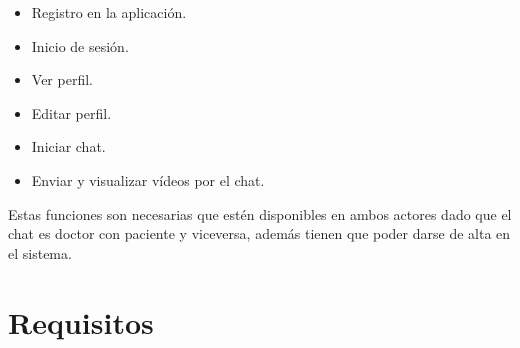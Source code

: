 \begin{itemize}
    \item Registro en la aplicación.
    \item Inicio de sesión.
    \item Ver perfil.
    \item Editar perfil.
    \item Iniciar chat.
    \item Enviar y visualizar vídeos por el chat.
\end{itemize}

Estas funciones son necesarias que estén disponibles en ambos actores dado que el chat
es doctor con paciente y viceversa, además tienen que poder darse de alta en el sistema.

\section{Requisitos}
